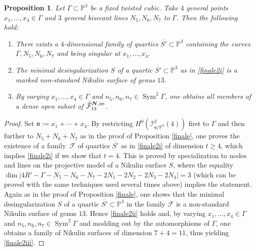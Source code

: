\documentclass[JEP,XML,SOM,Unicode,NoEqCountersInSection,published]{cedram}
\newcommand{\ns}{{\mkern1mu\mathrm{ns}}}
\newcommand{\bN}{\boldsymbol{N}}
\theoremstyle{plain}
\newtheorem{prop}[thm]{Proposition}
\theoremstyle{definition}
\DeclareMathOperator{\Sym}{Sym}
\newcommand\PP{{\mathbb P}}
\newcommand\F{{\mathcal F}}
\begin{document}
\begin{prop}\label{finale2}
Let $\Gamma\subset \PP^3$ be a fixed twisted cubic. Take $4$ general points $x_1,\ldots,x_4\in \Gamma$ and $3$ general bisecant lines $N_5,N_6,N_7$ to $\Gamma$. Then the following hold:
\begin{enumerate}
\item\label{finale2i}
There exists a $4$-dimensional family of quartics $\overline{S'}\subset\mathbb P^3$ containing the curves \linebreak $\Gamma,N_5,N_6,N_7$ and being singular at $x_1,\ldots,x_4$.
\item\label{finale2ii}
The minimal desingularization $S$ of a quartic $\overline{S'}\subset\mathbb P^3$ as in \eqref{finale2i} is a marked non-standard Nikulin surface of genus $13$.
\item\label{finale2iii}
By varying $x_1,\ldots,x_4\in \Gamma$ and $n_5, n_6,n_7\in \Sym^2\Gamma$, one obtains all members of a dense open subset of $\widehat{\F}_{13}^{\bN,\ns}$.
\end{enumerate}
\end{prop}

\begin{proof}
Set $\mathfrak n:=x_1+\cdots+x_4$. By restricting $H^0(\mathcal I^2_{\mathfrak{n}/\PP^3}(4))$ first to $\Gamma$ and then further to $N_5+N_6+N_7$ as in the proof of Proposition \ref{finale}, one proves the existence of a family~$\F$ of quartics $\overline{S'}$ as in \eqref{finale2i} of dimension $t\geq 4$, which implies \eqref{finale2i} if we show that $t=4$. This is proved by specialization to nodes and lines on the projective model of a Nikulin surface $S$, where the equality
$
\dim |4R'-\Gamma-N_5-N_6-N_7-2N_1-2N_2-2N_3-2N_4|=3
$
(which can be proved with the same techniques used several times above) implies the statement.
Again as in the proof of Proposition \ref{finale}, one shows that the minimal desingularization $S$ of a quartic $\overline{S'}\subset\mathbb P^3$ in the family $\F$ is a non-standard Nikulin surface of genus $13$. Hence \eqref{finale2ii} holds and, by varying $x_1,\ldots,x_4\in \Gamma$ and $n_5, n_6,n_7\in \Sym^2\Gamma$ and modding out by the automorphisms of $\Gamma$, one obtains a family of Nikulin surfaces of dimension $7+4= 11$, thus yielding \eqref{finale2iii}.
\end{proof}
\end{document}
